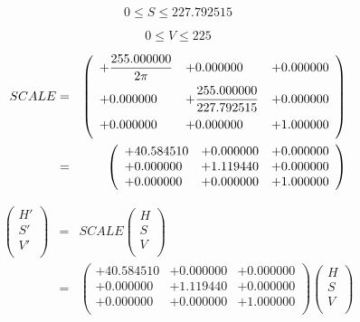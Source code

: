 \documentclass{article}
\begin{document}
\[ 0 \le S \le 227.792515 \]
\pagebreak

\[ 0 \le V \le 225 \]
\pagebreak

\begin{eqnarray*} SCALE &=& \left( \begin{array}{lll} +\dfrac{255.000000}{2\pi} & +0.000000 & +0.000000 \vspace{.5em} \\ +0.000000 & +\dfrac{255.000000}{227.792515} & +0.000000 \vspace{.5em} \\ +0.000000 & +0.000000 & +1.000000 \vspace{.5em} \\ \end{array} \right) \\ &=& \left( \begin{array}{lll} +40.584510 & +0.000000 & +0.000000 \\ +0.000000 & +1.119440 & +0.000000 \\ +0.000000 & +0.000000 & +1.000000 \\ \end{array} \right) \\ \end{eqnarray*}
\pagebreak

\begin{eqnarray*} \left( \begin{array}{l} H' \\ S' \\ V' \\ \end{array} \right) &=& SCALE \left( \begin{array}{l} H \\ S \\ V \\ \end{array} \right) \\ &=& \left( \begin{array}{lll} +40.584510 & +0.000000 & +0.000000 \\ +0.000000 & +1.119440 & +0.000000 \\ +0.000000 & +0.000000 & +1.000000 \\ \end{array} \right) \left( \begin{array}{l} H \\ S \\ V \\ \end{array} \right) \\ \end{eqnarray*}
\pagebreak
\end{document}
